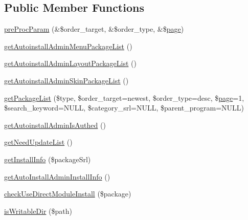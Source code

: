 \subsection*{Public Member Functions}
\begin{DoxyCompactItemize}
\item 
\hyperlink{classautoinstallAdminModel_a614c3051b3e9abff8c17dfc0664d6da5}{pre\+Proc\+Param} (\&\$order\+\_\+target, \&\$order\+\_\+type, \&\$\hyperlink{classpage}{page})
\item 
\hyperlink{classautoinstallAdminModel_a9cb4da298ab863dec8b7664cac2e42a5}{get\+Autoinstall\+Admin\+Menu\+Package\+List} ()
\item 
\hyperlink{classautoinstallAdminModel_a3892c760f1b77e23fdb38a9784cf0ec2}{get\+Autoinstall\+Admin\+Layout\+Package\+List} ()
\item 
\hyperlink{classautoinstallAdminModel_aee0002dcda8a05d57f8f7e5304be087c}{get\+Autoinstall\+Admin\+Skin\+Package\+List} ()
\item 
\hyperlink{classautoinstallAdminModel_ab0899e286869ec16acb00080daf311fb}{get\+Package\+List} (\$type, \$order\+\_\+target=\textquotesingle{}newest\textquotesingle{}, \$order\+\_\+type=\textquotesingle{}desc\textquotesingle{}, \$\hyperlink{classpage}{page}=\textquotesingle{}1\textquotesingle{}, \$search\+\_\+keyword=N\+U\+LL, \$category\+\_\+srl=N\+U\+LL, \$parent\+\_\+program=N\+U\+LL)
\item 
\hyperlink{classautoinstallAdminModel_ac0b475b5969fded7a56103ba2e1fa710}{get\+Autoinstall\+Admin\+Is\+Authed} ()
\item 
\hyperlink{classautoinstallAdminModel_a6bba9a390c1274bc3c39a39310781b01}{get\+Need\+Update\+List} ()
\item 
\hyperlink{classautoinstallAdminModel_a8824834dd97b7e69b74af51778d27ed6}{get\+Install\+Info} (\$package\+Srl)
\item 
\hyperlink{classautoinstallAdminModel_ad6d50fbb755d2b48cdbd4269a1d1e404}{get\+Auto\+Install\+Admin\+Install\+Info} ()
\item 
\hyperlink{classautoinstallAdminModel_a899c3f3182e6c80b28f0aabc261bf38c}{check\+Use\+Direct\+Module\+Install} (\$package)
\item 
\hyperlink{classautoinstallAdminModel_ab3314bacf64ba16ea88180124699fc54}{is\+Writable\+Dir} (\$path)
\end{DoxyCompactItemize}
